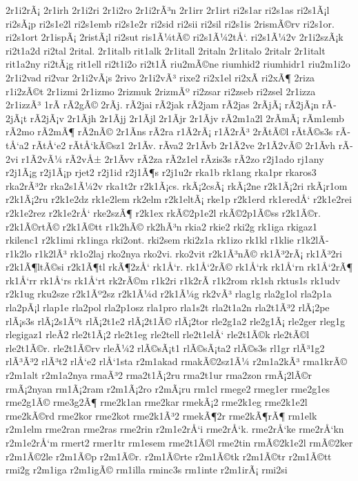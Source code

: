 {2r1i2rÃ¡
2r1irh
2r1i2ri
2r1i2ro
2r1i2rÃ³n
2r1irr
2r1irt
ri2s1ar
ri2s1as
ri2s1Ã¡l
ri2sÃ¡p
ri2s1e2l
ri2s1emb
ri2s1e2r
ri2sid
ri2sii
ri2sil
ri2s1is
2rismÃ©rv
ri2s1or.
ri2s1ort
2r1ispÃ¡
2ristÃ¡l
ri2sut
ris1Ã¼tÃ©
ri2s1Ã¼2tÅ‘.
ri2s1Ã¼2v
2r1i2szÃ¡k
ri2t1a2d
ri2tal
2rital.
2r1italb
rit1alk
2r1itall
2ritaln
2r1italo
2ritalr
2r1italt
rit1a2ny
ri2tÃ¡g
rit1ell
ri2t1i2o
ri2t1Ã­
riu2mÃ©ne
riumhid2
riumhidr1
riu2m1i2o
2r1i2vad
ri2var
2r1i2vÃ¡s
2rivo
2r1i2vÃ³
rixe2
ri2x1el
ri2xÃ­
ri2xÃ¶
2riza
r1i2zÃ©t
2r1izmi
2r1izmo
2rizmuk
2rizmÃº
ri2zsar
ri2zseb
ri2zsel
2r1izza
2r1izzÃ³
1rÃ­
rÃ­2gÃ©
2rÃ­j.
rÃ­2jai
rÃ­2jak
rÃ­2jam
rÃ­2jas
2rÃ­jÃ¡
rÃ­2jÃ¡n
rÃ­2jÃ¡t
rÃ­2jÃ¡v
2r1Ã­jh
2r1Ã­jj
2r1Ã­jl
2r1Ã­jr
2r1Ã­jv
rÃ­2m1a2l
2rÃ­mÃ¡
rÃ­m1emb
rÃ­2mo
rÃ­2mÃ¶
rÃ­2nÃ©
2r1Ã­ns
rÃ­2ra
r1Ã­2rÃ¡
r1Ã­2rÃ³
2rÃ­tÃ©l
rÃ­tÃ©s3s
rÃ­tÅ‘a2
rÃ­tÅ‘e2
rÃ­tÅ‘kÃ©sz1
2r1Ã­v.
rÃ­va2
2r1Ã­vb
2r1Ã­2ve
2r1Ã­2vÃ©
2r1Ã­vh
rÃ­2vi
r1Ã­2vÃ¼
rÃ­2vÅ±
2r1Ã­vv
rÃ­2za
rÃ­2z1el
rÃ­zis3s
rÃ­2zo
r2j1ado
rj1any
r2j1Ã¡g
r2j1Ã¡p
rjet2
r2j1id
r2j1Ã¶s
r2j1u2r
rka1b
rk1ang
rka1pr
rkaros3
rka2rÃ³2r
rka2s1Ã¼2v
rka1t2r
r2k1Ã¡cs.
rkÃ¡2csÃ¡
rkÃ¡2ne
r2k1Ã¡2ri
rkÃ¡r1om
r2k1Ã¡2ru
r2k1e2dz
rk1e2lem
rk2elm
r2k1eltÃ¡
rke1p
r2k1erd
rk1eredÅ‘
r2k1e2rei
r2k1e2rez
r2k1e2rÅ‘
rke2szÃ¶
r2k1ex
rkÃ©2p1e2l
rkÃ©2p1Ã©ss
r2k1Ã©r.
r2k1Ã©rtÃ©
r2k1Ã©tt
r1k2hÃ©
rk2hÃ³n
rkia2
rkie2
rki2g
rk1iga
rkigaz1
rkilenc1
r2k1imi
rk1inga
rki2ont.
rki2sem
rki2z1a
rk1izo
rk1kl
r1klie
r1k2lÃ­
r1k2lo
r1k2lÃ³
rk1o2laj
rko2nya
rko2vi.
rko2vit
r2k1Ã³nÃ©
rk1Ã³2rÃ¡
rk1Ã³2ri
r2k1Ã¶ltÃ©si
r2k1Ã¶tl
rkÃ¶2zÅ‘
rk1Å‘r.
rk1Å‘2rÃ©
rk1Å‘rk
rk1Å‘rn
rk1Å‘2rÃ¶
rk1Å‘rr
rk1Å‘rs
rk1Å‘rt
rk2rÃ©m
r1k2ri
r1k2rÃ­
r1k2rom
rk1sh
rktus1s
rk1udv
r2k1ug
rku2sze
r2k1Ãº2sz
r2k1Ã¼d
r2k1Ã¼g
rk2vÃ³
rlag1g
rla2g1ol
rla2p1a
rla2pÃ¡l
rlap1e
rla2pol
rla2p1osz
rla1pro
rla1s2t
rla2t1a2n
rla2t1Ã³2
rlÃ¡2pe
rlÃ¡s3s
rlÃ¡2s1Ãºt
rlÃ¡2t1e2
rlÃ¡2t1Ã©
rlÃ¡2tor
rle2g1a2
rle2g1Ã¡
rle2ger
rleg1g
rlegigaz1
rleÃ­2
rle2t1Ã¡2
rle2t1eg
rle2tell
rle2t1elÅ‘
rle2t1Ã©k
rle2tÃ©l
rle2t1Ã©r.
rle2t1Ã©rv
rleÃ¼2
rlÃ©sÃ¡t1
rlÃ©sÃ¡ta2
rlÃ©s3s
rl1gr
rlÃ³1g2
rlÃ³Ã³2
rlÃ³t2
rlÅ‘e2
rlÅ‘1sta
r2m1akad
rmakÃ©2sz1Ã¼
r2m1a2kÃ³
rma1krÃ©
r2m1alt
r2m1a2nya
rmaÃ³2
rma2t1Ã¡2ru
rma2t1ur
rma2zon
rmÃ¡2lÃ©r
rmÃ¡2nyan
rm1Ã¡2ram
r2m1Ã¡2ro
r2mÃ¡ru
rm1cl
rmege2
rmeg1er
rme2g1es
rme2g1Ã©
rme3g2Ã¶
rme2k1an
rme2kar
rmekÃ¡2
rme2k1eg
rme2k1e2l
rme2kÃ©rd
rme2kor
rme2kot
rme2k1Ã³2
rmekÃ¶2r
rme2kÃ¶rÃ¶
rm1elk
r2m1elm
rme2ran
rme2ras
rme2rin
r2m1e2rÅ‘i
rme2rÅ‘k.
rme2rÅ‘ke
rme2rÅ‘kn
r2m1e2rÅ‘m
rmert2
rmer1tr
rm1esem
rme2t1Ã©l
rme2tin
rmÃ©2k1e2l
rmÃ©2ker
r2m1Ã©2le
r2m1Ã©p
r2m1Ã©r.
r2m1Ã©rte
r2m1Ã©tk
r2m1Ã©tr
r2m1Ã©tt
rmi2g
r2m1iga
r2m1igÃ©
rm1illa
rminc3s
rm1inte
r2m1irÃ¡
rmi2si
}
